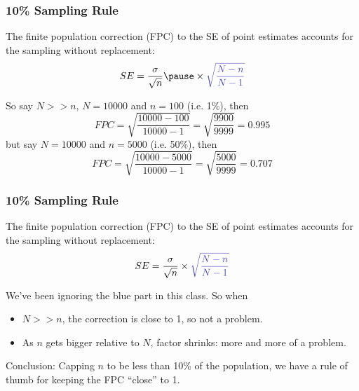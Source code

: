 \documentclass[handout]{beamer}
\newcommand{\blue}[1]{\textcolor{blue2}{#1}}
\begin{document}
\begin{frame}[fragile]
\frametitle{10\% Sampling Rule}
The \blue{finite population correction (FPC)} to the SE of point estimates accounts for the sampling without replacement:
\[
SE = \frac{\sigma}{\sqrt{n}} \pause \times \blue{\sqrt{\frac{N-n}{N-1}}}
\]

\pause So say $N >> n$, $N=10000$ and $n=100$ (i.e. 1\%), then
\[
FPC=\sqrt{\frac{10000-100}{10000-1}} = \sqrt{\frac{9900}{9999}} = 0.995
\]
\pause but say $N=10000$ and $n=5000$ (i.e. 50\%), then
\[
FPC=\sqrt{\frac{10000-5000}{10000-1}} = \sqrt{\frac{5000}{9999}} = 0.707
\]

\end{frame}


\begin{frame}[fragile]
\frametitle{10\% Sampling Rule}
The \blue{finite population correction (FPC)} to the SE of point estimates accounts for the sampling without replacement:
\[
SE = \frac{\sigma}{\sqrt{n}} \times \blue{\sqrt{\frac{N-n}{N-1}}}
\]

\vspace{0.25cm}
\pause
We've been ignoring the blue part in this class.  So when 
\begin{itemize}
\pause\item $N >> n$, the correction is close to 1, so not a problem.
\pause\item As $n$ gets bigger relative to $N$, factor shrinks:  more and more of a problem.  
\end{itemize}

\vspace{0.25cm}
\pause
Conclusion:  Capping $n$ to be less than 10\% of the population, we have a \blue{rule of thumb} for keeping the FPC ``close'' to 1.  

\end{frame}
\end{document}
